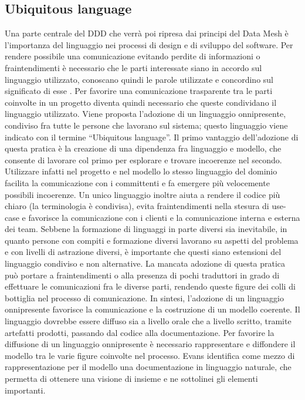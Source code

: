 \documentclass[12pt]{report}
\begin{document}
\subsection{Ubiquitous language}
Una parte centrale del DDD che verrà poi ripresa dai principi del Data Mesh è l'importanza del linguaggio nei processi di design e di sviluppo del software.
Per rendere possibile una comunicazione evitando perdite di informazioni o fraintendimenti è necessario che le parti interessate siano in accordo sul linguaggio utilizzato, conoscano quindi le parole utilizzate e concordino sul significato di esse \cite{adler_how_2014}.
Per favorire una comunicazione trasparente tra le parti coinvolte in un progetto diventa quindi necessario che queste condividano il linguaggio utilizzato.
Viene proposta l'adozione di un linguaggio onnipresente, condiviso fra tutte le persone che lavorano sul sistema; questo linguaggio viene indicato con il termine ``Ubiquitous language''.
Il primo vantaggio dell'adozione di questa pratica è la creazione di una dipendenza fra linguaggio e modello, che consente di lavorare col primo per esplorare e trovare incoerenze nel secondo.
Utilizzare infatti nel progetto e nel modello lo stesso linguaggio del dominio facilita la comunicazione con i committenti e fa emergere più velocemente possibili incoerenze.
Un unico linguaggio inoltre aiuta a rendere il codice più chiaro (la terminologia è condivisa), evita fraintendimenti nella stesura di use-case e favorisce la comunicazione con i clienti e la comunicazione interna e esterna dei team.
Sebbene la formazione di linguaggi in parte diversi sia inevitabile, in quanto persone con compiti e formazione diversi lavorano su aspetti del problema e con livelli di astrazione diversi, è importante che questi siano estensioni del linguaggio condiviso e non alternative.
La mancata adozione di questa pratica può portare a fraintendimenti o alla presenza di pochi traduttori in grado di effettuare le comunicazioni fra le diverse parti, rendendo queste figure dei colli di bottiglia nel processo di comunicazione. 
In sintesi, l'adozione di un linguaggio onnipresente favorisce la comunicazione e la costruzione di un modello coerente.
Il linguaggio dovrebbe essere diffuso sia a livello orale che a livello scritto, tramite artefatti prodotti, passando dal codice alla documentazione.
Per favorire la diffusione di un linguaggio onnipresente è necessario rappresentare e diffondere il modello tra le varie figure coinvolte nel processo.
Evans identifica come mezzo di rappresentazione per il modello una documentazione in linguaggio naturale, che permetta di ottenere una visione di insieme e ne sottolinei gli elementi importanti.
\end{document}
